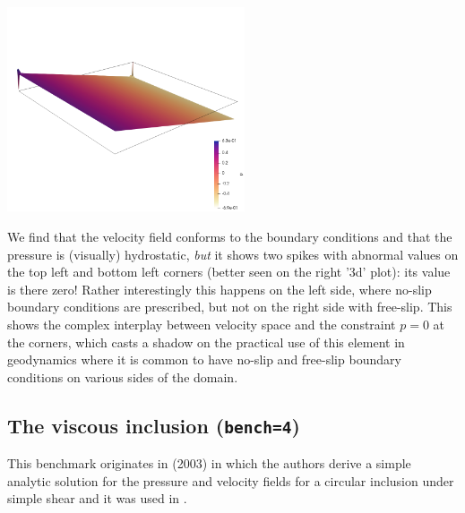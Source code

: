 \begin{center}
\includegraphics[width=7cm]{python_codes/fieldstone_161/results/bench3/press2}
\end{center}

We find that the velocity field conforms to the boundary conditions and that 
the pressure is (visually) hydrostatic, {\it but} it shows two spikes with abnormal 
values on the top left and bottom left corners (better seen on the right '3d' plot): 
its value is there zero! Rather 
interestingly this happens on the left side, where no-slip boundary 
conditions are prescribed, but not on the right side with free-slip.
This shows the complex interplay between velocity space and the 
constraint $p=0$ at the corners, which casts a shadow on the practical use of this element
in geodynamics where it is common to have no-slip and free-slip boundary conditions on
various sides of the domain.

\subsection*{The viscous inclusion ({\tt bench=4})}

This benchmark originates in \textcite{scpo03} (2003) in which the 
authors derive a simple analytic solution for the pressure and 
velocity fields for a circular 
inclusion under simple shear and it was used 
in \cite{deka08,sunh10,dumg11,krhb12,gemd13}.

